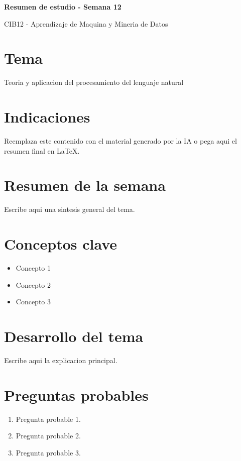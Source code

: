 \documentclass[8pt,a4paper,twocolumn]{article}
\newcommand{\resumentitulo}{Resumen de estudio - Semana 12}
\begin{document}
\vspace*{-1.0em}
\begin{tcolorbox}[colback=black!12,colframe=black!35,boxrule=0.3pt,arc=1pt,left=4pt,right=4pt,top=3pt,bottom=3pt]
{\bfseries\normalsize \resumentitulo\par}
{\scriptsize CIB12 - Aprendizaje de Maquina y Mineria de Datos\par}
\end{tcolorbox}
\vspace{0.15em}

\section*{Tema}
Teoria y aplicacion del procesamiento del lenguaje natural

\section*{Indicaciones}
Reemplaza este contenido con el material generado por la IA o pega aqui el resumen final en LaTeX.

\section*{Resumen de la semana}
Escribe aqui una sintesis general del tema.

\section*{Conceptos clave}
\begin{itemize}
    \item Concepto 1
    \item Concepto 2
    \item Concepto 3
\end{itemize}

\section*{Desarrollo del tema}
Escribe aqui la explicacion principal.

\section*{Preguntas probables}
\begin{enumerate}
    \item Pregunta probable 1.
    \item Pregunta probable 2.
    \item Pregunta probable 3.
\end{enumerate}
\end{document}

